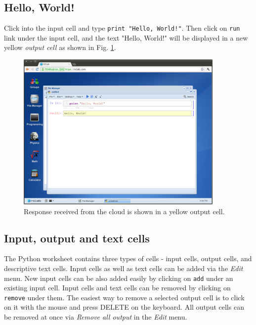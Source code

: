 \documentclass[article,A4,12pt]{llncs}
\begin{document}
\subsection{Hello, World!}

Click into the input cell and type {\tt print "Hello, World!"}.
Then click on {\tt run} link under the input cell, and the text 
"Hello, World!" will be displayed 
in a new yellow {\em output cell} as shown in Fig. \ref{fig:python-2}.

\newpage

\begin{figure}[!ht]
\begin{center}
\includegraphics[width=0.9\textwidth]{img/python-2.png}
\end{center}
\vspace{-2mm}
\caption{Response received from the cloud is shown in a yellow output cell.}
\label{fig:python-2}
\end{figure}

\subsection{Input, output and text cells}

The Python worksheet contains three types of cells - input cells, output cells, 
and descriptive text cells. Input cells as well as text cells can be added via 
the {\em Edit} menu. New input cells can be also added easily by clicking on {\tt add} under
an existing input cell. Input cells and text cells can be removed by clicking on 
{\tt remove} under them. The easiest way to remove a selected output cell is to 
click on it with the mouse and press DELETE on the keyboard. 
All output cells can be removed at once via {\em Remove all output} in the {\em Edit} menu. 
\end{document}
